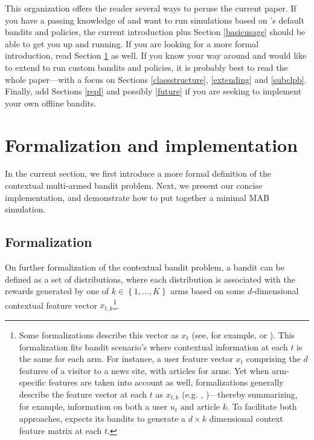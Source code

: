 \documentclass{jss}
\begin{document}
This organization offers the reader several ways to peruse the current paper. If you have a passing knowledge of  and want to run simulations based on 's default bandits and policies, the current introduction plus Section \ref{basicusage} should be able to get you up and running. If you are looking for a more formal introduction, read Section \ref{formalizationandimplementation} as well. If you know your way around  and would like to extend  to run custom bandits and policies, it is probably best to read the whole paper---with a focus on Sections \ref{classstructure}, \ref{extending} and \ref{subclpb}. Finally, add Sections \ref{repl} and possibly \ref{future} if you are seeking to implement your own offline bandits.

\section{Formalization and implementation} \label{formalizationandimplementation}

In the current section, we first introduce a more formal definition of the contextual multi-armed bandit problem. Next, we present our concise implementation, and demonstrate how to put together a minimal MAB simulation.

\subsection{Formalization} \label{formalization}

On further formalization of the contextual bandit problem, a bandit can be defined as a set of distributions, where each distribution is associated with the rewards generated by one of \(k \in \left\{ 1, \dots, K \right\}\) arms based on some $d$-dimensional contextual feature vector \(x_{t,k}\)\footnote{Some formalizations describe this vector as $x_t$ (see, for example, \cite{Slivkins2014} or \cite{May2012}). This formalization fits bandit scenario's where contextual information at each $t$ is the same for each arm. For instance, a user feature vector $x_t$ comprising the $d$ features of a visitor to a news site, with articles for arms. Yet when arm-specific features are taken into account as well, formalizations generally describe the feature vector at each $t$ as $x_{t,k}$ (e.g. \cite{Chu2009}, \cite{Li2010})---thereby summarizing, for example, information on both a user $u_t$ and article $k$. To facilitate both approaches,  expects its bandits to generate a $d \times k$ dimensional context feature matrix at each $t$.}.
\end{document}
